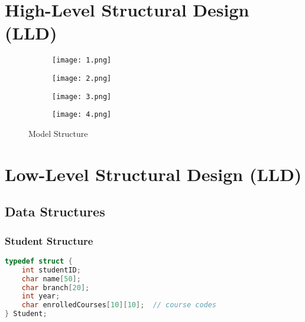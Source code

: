 \documentclass[12pt]{article}
\begin{document}
\section{High-Level Structural Design (LLD)}
\begin{figure}[h!]
    \centering
    \begin{subfigure}[b]{0.48\textwidth}
        \centering
        \texttt{[image: 1.png]}
        
        \label{fig:uml_seating}
    \end{subfigure}
    \hfill
    \begin{subfigure}[b]{0.48\textwidth}
        \centering
        \texttt{[image: 2.png]}
        
        \label{fig:uml_seating}
    \end{subfigure}
    \begin{subfigure}[b]{0.48\textwidth}
        \centering
        \texttt{[image: 3.png]}
        
        \label{fig:uml_seating}
    \end{subfigure}
    \begin{subfigure}[b]{0.48\textwidth}
        \centering
        \texttt{[image: 4.png]}
        
        \label{fig:uml_timetable}
    \end{subfigure}
    \caption{Model Structure}
    \label{fig:uml_side_by_side}
\end{figure}
\newpage
\section{Low-Level Structural Design (LLD)}

\subsection{Data Structures}

\subsubsection{Student Structure}
\begin{lstlisting}[language=C]
typedef struct {
    int studentID;
    char name[50];
    char branch[20];
    int year;
    char enrolledCourses[10][10];  // course codes
} Student;
\end{lstlisting}
\end{document}
